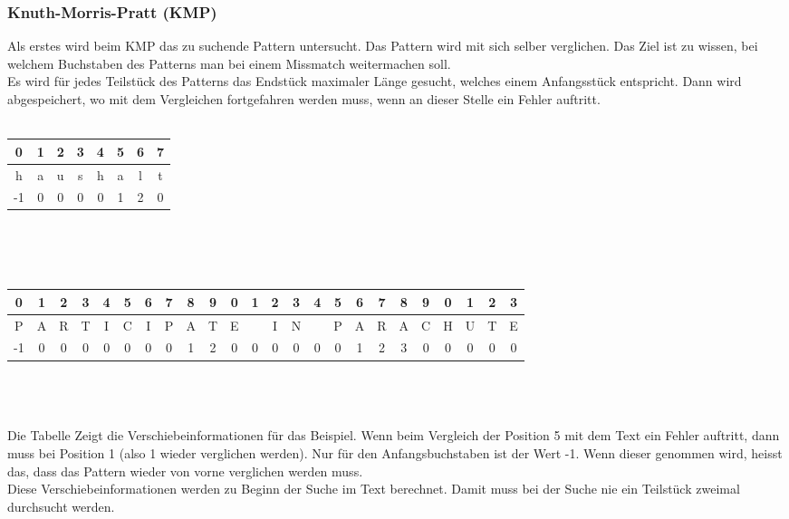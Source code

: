 \documentclass[a4paper,10pt]{article}
\begin{document}
\subsubsection{Knuth-Morris-Pratt (KMP)}
Als erstes wird beim KMP das zu suchende Pattern untersucht. Das Pattern wird mit sich selber verglichen. Das Ziel ist zu wissen, bei welchem Buchstaben des Patterns man bei einem Missmatch weitermachen soll. \\
Es wird f\"ur jedes Teilst\"uck des Patterns das Endst\"uck maximaler L\"ange gesucht, welches einem Anfangsst\"uck entspricht. Dann wird abgespeichert, wo mit dem Vergleichen fortgefahren werden muss, wenn an dieser Stelle ein Fehler auftritt. \\ \\
\begin{tabular}{|c|c|c|c|c|c|c|c|}
	\hline 
	0 & 1 & 2 & 3 & 4 & 5 & 6 & 7 \\
	\hline
	h & a & u & s & h & a & l & t \\
	\hline
	-1 & 0 & 0 & 0 & 0 & 1 & 2 & 0 \\
	\hline
\end{tabular} \\ \\ \\
\begin{tabular}{|c|c|c|c|c|c|c|c|c|c|c|c|c|c|c|c|c|c|c|c|c|c|c|c|}\hline 
	0 &  1 &  2 &  3 &  4 &  5 &  6 &  7 &  8 &  9 &  0 &  1 &  2 &  3 &  4 &  5 &  6 &  7 &  8 &  9 &  0 &  1 &  2 &  3 \\\hline
	P &  A &  R &  T &  I &  C &  I &  P &  A &  T &  E &  &  I &  N &   &  P &  A &  R &  A &  C &  H &  U &  T &  E  \\\hline
	-1 &  0 &  0 &  0 &  0 &  0 &  0 &  0 &  1 &  2 &  0 &  0 &  0 &  0 &  0 &  0 &  1 &  2 &  3 &  0 &  0 &  0 &  0 &  0 \\\hline
\end{tabular}
\\ \\ \\

Die Tabelle Zeigt die Verschiebeinformationen f\"ur das Beispiel. Wenn beim Vergleich der Position 5 mit dem Text ein Fehler auftritt, dann muss bei Position 1 (also 1 wieder verglichen werden). Nur f\"ur den Anfangsbuchstaben ist der Wert -1. Wenn dieser genommen wird, heisst das, dass das Pattern wieder von vorne verglichen werden muss. \\
Diese Verschiebeinformationen werden zu Beginn der Suche im Text berechnet. Damit muss bei der Suche nie ein Teilst\"uck zweimal durchsucht werden. \\
\end{document}

